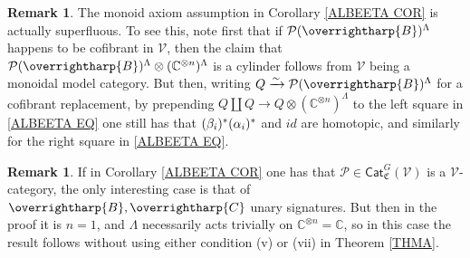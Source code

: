 \documentclass[a4paper,10pt
 ,final
]{article}%
\numberwithin{equation}{section}
\numberwithin{figure}{section}
\theoremstyle{definition} %
\newtheorem{remark}[equation]{Remark}%
\newcommand{\vect}[1]{\text{\overrightharp{\ensuremath{#1}}}}
\newcommand{\V}{\ensuremath{\mathcal V}}
\renewcommand{\P}{\ensuremath{\mathcal P}}
\newcommand{\1}{\ensuremath{\mathbbm 1}}%
\begin{document}
\begin{remark}\label{MONAXSUP REM}
	The monoid axiom assumption in Corollary \ref{ALBEETA COR} 
	is actually superfluous.
	To see this, note first that if
	$\mathcal{P}(\vect{B})^{\Lambda}$ happens to be cofibrant in $\V$,
	then the claim that
	$\mathcal{P}(\vect{B})^{\Lambda} \otimes (\mathbb{C}^{\otimes n})^{\Lambda}$
	is a cylinder follows from $\V$ being a monoidal model category.
	But then, writing $Q \xrightarrow{\sim} \mathcal{P}(\vect{B})^{\Lambda}$
	for a cofibrant replacement,
	by prepending 
	$Q \amalg Q \to Q \otimes (\mathbb{C}^{\otimes n})^{\Lambda}$
	to the left square in \eqref{ALBEETA EQ}
	one still has that 
	$(\beta_i)^{\**}(\alpha_i)^{\**}$
	and
	$id$
	are homotopic, and similarly for the right square in \eqref{ALBEETA EQ}.
\end{remark}



\begin{remark}\label{ALBEETA_REM}
If in Corollary \ref{ALBEETA COR}
one has that $\P \in \mathsf{Cat}^G_{\mathfrak{C}}(\V)$
is a $\V$-category,
the only interesting case is that of
$\vect{B},\vect{C}$ unary signatures.
But then in the proof it is $n=1$,
and $\Lambda$ necessarily acts trivially on
$\mathbb{C}^{\otimes n} = \mathbb{C}$,
so in this case the result follows without using either condition (v) or (vii) in Theorem \ref{THMA}.
\end{remark}
\end{document}

